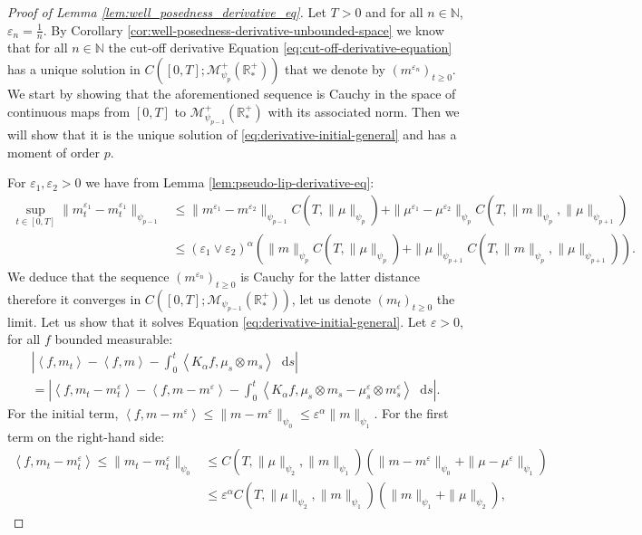 \documentclass[11pt,a4paper]{article}
\newcommand{\NN}{\mathbb{N}}
\newcommand{\RRP}{\mathbb{R}^+_*}
\newcommand{\MC}{\mathcal{M}}
\newcommand{\Proc}[1]{\left(#1\right)_{t\geq 0}}
\newcommand{\brac}[1]{\left\langle#1\right\rangle}
\newcommand{\dd}{\mathop{}\!\mathrm{d}}
\begin{document}
\begin{proof}[Proof of Lemma \ref{lem:well_posedness_derivative_eq}]
    Let $T > 0$ and for all $n\in \NN$, $\varepsilon_n = \frac1n$. By Corollary \ref{cor:well-posedness-derivative-unbounded-space} we know that for all $n \in \NN$ the cut-off derivative Equation \eqref{eq:cut-off-derivative-equation} has a unique solution in $C\left([0,T]; \MC_{\psi_{p}}^+ (\RRP)\right)$ that we denote by $\Proc{m^{\varepsilon_n}}$. We start by showing that the aforementioned sequence is Cauchy in the space of continuous maps from $[0,T]$ to $\MC_{\psi_{p-1}}^+ (\RRP)$ with its associated norm. Then we will show that it is the unique solution of \eqref{eq:derivative-initial-general} and has a moment of order $p$.
    
    For $\varepsilon_1, \varepsilon_2 > 0$ we have from Lemma \ref{lem:pseudo-lip-derivative-eq}:
    \begin{align*}
        \sup\limits_{t\in [0,T]} \| m^{\varepsilon_1}_t - m^{\varepsilon_1}_t\|_{\psi_{p-1}} 
        &\leq \|m^{\varepsilon_1} - m^{\varepsilon_2}\|_{\psi_{p-1}} C(T,\|\mu\|_{\psi_{p}}) + \|\mu^{\varepsilon_1} - \mu^{\varepsilon_2}\|_{\psi_{p}}C(T,\|m\|_{\psi_p},\|\mu\|_{\psi_{p+1}}) \\
        &\leq \left(\varepsilon_1 \vee \varepsilon_2\right)^{\alpha} \left(\|m\|_{\psi_{p}} C(T,\|\mu\|_{\psi_{p}}) + \|\mu\|_{\psi_{p+1}}C(T,\|m\|_{\psi_p},\|\mu\|_{\psi_{p+1}})\right).
    \end{align*}
    We deduce that the sequence $\Proc{m^{\varepsilon_n}}$ is Cauchy for the latter distance therefore it converges in $C\left([0,T];\MC_{\psi_{p-1}}(\RRP)\right)$, let us denote $\Proc{m_t}$ the limit. Let us show that it solves Equation \eqref{eq:derivative-initial-general}. Let $\varepsilon > 0$, for all $f$  bounded measurable:
    \begin{multline*}
        \left| \brac{f,m_t} - \brac{f,m} - \int_0^t \brac{K_\alpha f,\mu_s \otimes m_s} \dd s\right|\\
        = \left| \brac{f,m_t- m^\varepsilon_t} - \brac{f,m - m^\varepsilon} - \int_0^t \brac{K_\alpha f,\mu_s \otimes m_s - \mu^\varepsilon_s \otimes m^\varepsilon_s} \dd s\right|.
    \end{multline*}
    For the initial term, $\brac{f,m - m^\varepsilon} \leq \|m - m^\varepsilon\|_{\psi_0} \leq \varepsilon^\alpha\|m\|_{\psi_1}$. For the first term on the right-hand side:
    \begin{align*}
        \brac{f,m_t- m^\varepsilon_t}\leq \|m_t - m_t^\varepsilon\|_{\psi_0} &\leq C(T,\|\mu\|_{\psi_2},\|m\|_{\psi_1}) \left(\|m- m^\varepsilon\|_{\psi_0} + \|\mu- \mu^\varepsilon\|_{\psi_1}\right)\\ &\leq \varepsilon^\alpha C(T,\|\mu\|_{\psi_2},\|m\|_{\psi_1}) \left(\|m\|_{\psi_1} + \|\mu\|_{\psi_2}\right),

\end{align*}
\end{proof}
\end{document}
